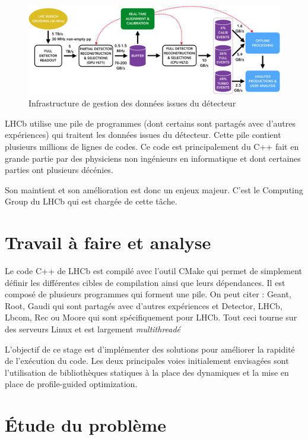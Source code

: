 \documentclass[a4paper]{report}
\begin{document}
\begin{figure}[!htb]
    \includegraphics[width=\textwidth, center]{LHCb_stack.png}
    \caption{Infrastructure de gestion des données issues du détecteur}
    \label{LHCb_stack}
\end{figure}

LHCb utilise une pile de programmes (dont certains sont partagés avec d'autres expériences) qui traitent les données issues du détecteur.
Cette pile contient plusieurs millions de lignes de codes.
Ce code est principalement du C++ fait en grande partie par des physiciens non ingénieurs en informatique et dont certaines parties ont plusieurs décénies.

Son maintient et son amélioration est donc un enjeux majeur.
C'est le Computing Group du LHCb qui est chargée de cette tâche.

\section{Travail à faire et analyse}
Le code C++ de LHCb est compilé avec l'outil CMake qui permet de simplement définir les différentes cibles de compilation ainsi que leurs dépendances.
Il est composé de plusieurs programmes qui forment une pile.
On peut citer : Geant, Root, Gaudi qui sont partagés avec d'autres expériences et Detector, LHCb, Lbcom, Rec ou Moore qui sont spécifiquement pour LHCb.
Tout ceci tourne sur des serveurs Linux et est largement \emph{multithreadé}

L'objectif de ce stage est d'implémenter des solutions pour améliorer la rapidité de l'exécution du code.
Les deux principales voies initialement envisagées sont l'utilisation de bibliothèques statiques à la place des dynamiques et la mise en place de profile-guided optimization.

\section{Étude du problème}
\end{document}
